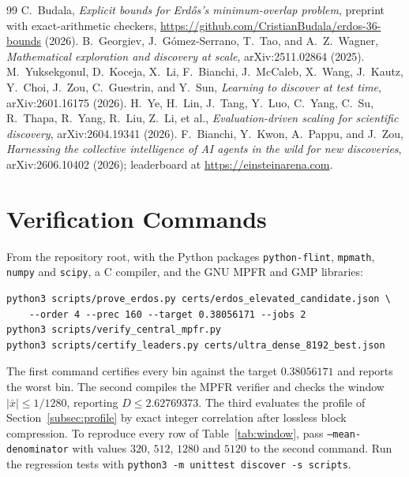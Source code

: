 \documentclass[11pt,a4paper]{article}
\theoremstyle{definition}
\theoremstyle{remark}
\begin{document}
\begin{thebibliography}{99}
 C.~Budala, \emph{Explicit bounds for Erd\H{o}s's minimum-overlap problem}, preprint with exact-arithmetic checkers, \url{https://github.com/CristianBudala/erdos-36-bounds} (2026).
 B.~Georgiev, J.~G\'omez-Serrano, T.~Tao, and A.~Z.~Wagner, \emph{Mathematical exploration and discovery at scale}, arXiv:2511.02864 (2025).
 M.~Yuksekgonul, D.~Koceja, X.~Li, F.~Bianchi, J.~McCaleb, X.~Wang, J.~Kautz, Y.~Choi, J.~Zou, C.~Guestrin, and Y.~Sun, \emph{Learning to discover at test time}, arXiv:2601.16175 (2026).
 H.~Ye, H.~Lin, J.~Tang, Y.~Luo, C.~Yang, C.~Su, R.~Thapa, R.~Yang, R.~Liu, Z.~Li, et al., \emph{Evaluation-driven scaling for scientific discovery}, arXiv:2604.19341 (2026).
 F.~Bianchi, Y.~Kwon, A.~Pappu, and J.~Zou, \emph{Harnessing the collective intelligence of AI agents in the wild for new discoveries}, arXiv:2606.10402 (2026); leaderboard at \url{https://einsteinarena.com}.
\end{thebibliography}

\appendix

\section{Verification Commands}
\label{app:code}

From the repository root, with the Python packages \texttt{python-flint}, \texttt{mpmath}, \texttt{numpy} and \texttt{scipy}, a C compiler, and the GNU MPFR and GMP libraries:
\begin{verbatim}
python3 scripts/prove_erdos.py certs/erdos_elevated_candidate.json \
    --order 4 --prec 160 --target 0.38056171 --jobs 2
python3 scripts/verify_central_mpfr.py
python3 scripts/certify_leaders.py certs/ultra_dense_8192_best.json
\end{verbatim}
The first command certifies every bin against the target $0.38056171$ and reports the worst bin. The second compiles the MPFR verifier and checks the window $|\bar{x}| \le 1/1280$, reporting $D \le 2.62769373$. The third evaluates the profile of Section~\ref{subsec:profile} by exact integer correlation after lossless block compression. To reproduce every row of Table~\ref{tab:window}, pass \texttt{--mean-denominator} with values $320$, $512$, $1280$ and $5120$ to the second command. Run the regression tests with \texttt{python3 -m unittest discover -s scripts}.
\end{document}
